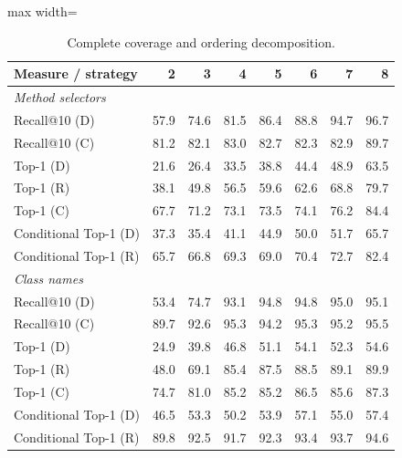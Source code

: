 \else
\begin{table}[t]
\centering
\caption{Complete coverage and ordering decomposition.}
\label{tab:reranking-coverage}
\setlength{\tabcolsep}{2.0pt}
\small
\begin{adjustbox}{max width=\columnwidth}
\begin{tabular}{lrrrrrrr}
\toprule
\textbf{Measure / strategy} & 2 & 3 & 4 & 5 & 6 & 7 & 8 \\
\midrule
\multicolumn{8}{l}{\textit{Method selectors}} \\
Recall@10 (D) & 57.9 & 74.6 & 81.5 & 86.4 & 88.8 & 94.7 & 96.7 \\
Recall@10 (C) & 81.2 & 82.1 & 83.0 & 82.7 & 82.3 & 82.9 & 89.7 \\
Top-1 (D) & 21.6 & 26.4 & 33.5 & 38.8 & 44.4 & 48.9 & 63.5 \\
Top-1 (R) & 38.1 & 49.8 & 56.5 & 59.6 & 62.6 & 68.8 & 79.7 \\
Top-1 (C) & 67.7 & 71.2 & 73.1 & 73.5 & 74.1 & 76.2 & 84.4 \\
Conditional Top-1 (D) & 37.3 & 35.4 & 41.1 & 44.9 & 50.0 & 51.7 & 65.7 \\
Conditional Top-1 (R) & 65.7 & 66.8 & 69.3 & 69.0 & 70.4 & 72.7 & 82.4 \\
\midrule
\multicolumn{8}{l}{\textit{Class names}} \\
Recall@10 (D) & 53.4 & 74.7 & 93.1 & 94.8 & 94.8 & 95.0 & 95.1 \\
Recall@10 (C) & 89.7 & 92.6 & 95.3 & 94.2 & 95.3 & 95.2 & 95.5 \\
Top-1 (D) & 24.9 & 39.8 & 46.8 & 51.1 & 54.1 & 52.3 & 54.6 \\
Top-1 (R) & 48.0 & 69.1 & 85.4 & 87.5 & 88.5 & 89.1 & 89.9 \\
Top-1 (C) & 74.7 & 81.0 & 85.2 & 85.2 & 86.5 & 85.6 & 87.3 \\
Conditional Top-1 (D) & 46.5 & 53.3 & 50.2 & 53.9 & 57.1 & 55.0 & 57.4 \\
Conditional Top-1 (R) & 89.8 & 92.5 & 91.7 & 92.3 & 93.4 & 93.7 & 94.6 \\
\bottomrule
\end{tabular}
\end{adjustbox}
\end{table}
\fi
